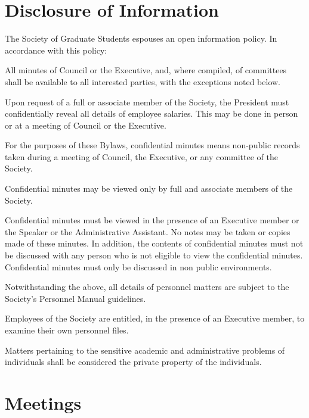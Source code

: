 \section{Disclosure of Information}
The Society of Graduate Students espouses an open information policy. In accordance with this policy:
\begin{longenum}[ label*=\thesection.\arabic*., align=left]
	\item All minutes of Council or the Executive, and, where compiled, of committees shall be available to all interested parties, with the exceptions noted below.
    \item Upon request of a full or associate member of the Society, the  President must confidentially reveal all details of employee salaries. This may be done  in person  or at a meeting of Council or the Executive.
    \item For the purposes of these Bylaws, confidential minutes means non-public records taken during a meeting of Council, the Executive, or any committee of the Society.
    \item Confidential minutes may be viewed only by full and associate members of the Society.
    \item Confidential minutes must be viewed in the presence of an Executive member or the Speaker or the Administrative Assistant. No notes may be taken or copies made of these minutes. In addition, the contents of confidential minutes must not be discussed with any person who is not eligible to view the confidential minutes. Confidential minutes must only be discussed in non public environments.
    \item Notwithstanding the above, all details of personnel matters are subject to the Society's Personnel Manual guidelines.
    \item Employees of the Society are entitled, in the presence of an Executive member, to examine their own personnel files.
    \item Matters pertaining to the sensitive academic and administrative problems of individuals shall be considered the private property of the individuals.
    \end{longenum}
\newpage

\section{Meetings}
